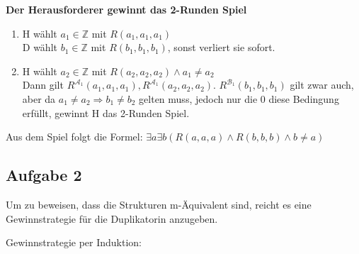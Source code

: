 \documentclass[a4paper,10pt]{article}
\newcommand{\Z}{\mathbb{Z}}
\begin{document}
\begin{enumerate}[(i)]
\begin{enumerate}[1. \text{Zug:}]
		\end{enumerate}
	\textbf{Der Herausforderer gewinnt das 2-Runden Spiel}
		\begin{enumerate}[1. \text{Zug:}]
			\item  	H wählt $a_1 \in \mathbb{Z}$ mit $R(a_1,a_1,a_1)$ \\
				D wählt $b_1 \in \Z$ mit $R(b_1,b_1,b_1) $, sonst verliert sie sofort.
			\item  	H wählt $a_2 \in \mathbb{Z}$ mit $R(a_2,a_2,a_2) \land a_1 \neq a_2$ \\
			Dann gilt $R^{\mathcal{A}_1}(a_1,a_1,a_1), R^{\mathcal{A}_1}(a_2,a_2,a_2)$. $R^{\mathcal{B}_1}(b_1,b_1,b_1)$ gilt zwar auch, aber da $a_1 \neq a_2 \Rightarrow b_1 \neq b_2$ gelten muss, jedoch nur die $0$ diese Bedingung erfüllt, gewinnt H das 2-Runden Spiel.

		\end{enumerate}
	Aus dem Spiel folgt die Formel: $\exists a \exists b(R(a,a,a) \land R(b,b,b) \land b \neq a)$

\end{enumerate}
\subsection*{Aufgabe 2}
	Um zu beweisen, dass die Strukturen m-Äquivalent sind, reicht es eine Gewinnstrategie für die Duplikatorin anzugeben. 
	
	Gewinnstrategie per Induktion:
	
\end{document}

